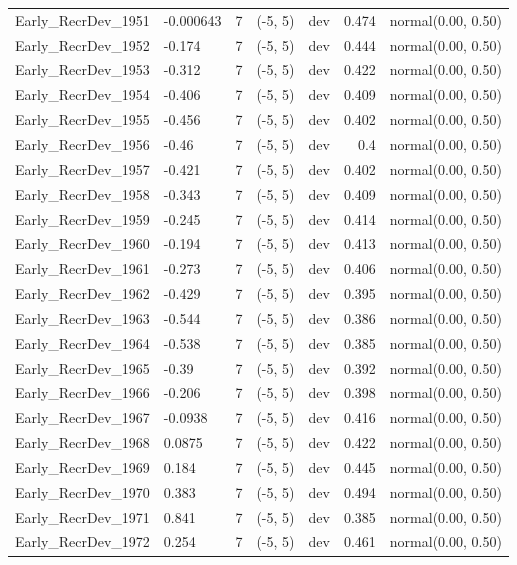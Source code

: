 \documentclass[
]{scrartcl}
\begin{document}
\begin{landscape}
\begin{longtable}{llrllrl}
Early\_RecrDev\_1951 & -0.000643 & 7 & (-5, 5) & dev & 0.474 & normal(0.00, 0.50) \\ 
Early\_RecrDev\_1952 & -0.174 & 7 & (-5, 5) & dev & 0.444 & normal(0.00, 0.50) \\ 
Early\_RecrDev\_1953 & -0.312 & 7 & (-5, 5) & dev & 0.422 & normal(0.00, 0.50) \\ 
Early\_RecrDev\_1954 & -0.406 & 7 & (-5, 5) & dev & 0.409 & normal(0.00, 0.50) \\ 
Early\_RecrDev\_1955 & -0.456 & 7 & (-5, 5) & dev & 0.402 & normal(0.00, 0.50) \\ 
Early\_RecrDev\_1956 & -0.46 & 7 & (-5, 5) & dev & 0.4 & normal(0.00, 0.50) \\ 
Early\_RecrDev\_1957 & -0.421 & 7 & (-5, 5) & dev & 0.402 & normal(0.00, 0.50) \\ 
Early\_RecrDev\_1958 & -0.343 & 7 & (-5, 5) & dev & 0.409 & normal(0.00, 0.50) \\ 
Early\_RecrDev\_1959 & -0.245 & 7 & (-5, 5) & dev & 0.414 & normal(0.00, 0.50) \\ 
Early\_RecrDev\_1960 & -0.194 & 7 & (-5, 5) & dev & 0.413 & normal(0.00, 0.50) \\ 
Early\_RecrDev\_1961 & -0.273 & 7 & (-5, 5) & dev & 0.406 & normal(0.00, 0.50) \\ 
Early\_RecrDev\_1962 & -0.429 & 7 & (-5, 5) & dev & 0.395 & normal(0.00, 0.50) \\ 
Early\_RecrDev\_1963 & -0.544 & 7 & (-5, 5) & dev & 0.386 & normal(0.00, 0.50) \\ 
Early\_RecrDev\_1964 & -0.538 & 7 & (-5, 5) & dev & 0.385 & normal(0.00, 0.50) \\ 
Early\_RecrDev\_1965 & -0.39 & 7 & (-5, 5) & dev & 0.392 & normal(0.00, 0.50) \\ 
Early\_RecrDev\_1966 & -0.206 & 7 & (-5, 5) & dev & 0.398 & normal(0.00, 0.50) \\ 
Early\_RecrDev\_1967 & -0.0938 & 7 & (-5, 5) & dev & 0.416 & normal(0.00, 0.50) \\ 
Early\_RecrDev\_1968 & 0.0875 & 7 & (-5, 5) & dev & 0.422 & normal(0.00, 0.50) \\ 
Early\_RecrDev\_1969 & 0.184 & 7 & (-5, 5) & dev & 0.445 & normal(0.00, 0.50) \\ 
Early\_RecrDev\_1970 & 0.383 & 7 & (-5, 5) & dev & 0.494 & normal(0.00, 0.50) \\ 
Early\_RecrDev\_1971 & 0.841 & 7 & (-5, 5) & dev & 0.385 & normal(0.00, 0.50) \\ 
Early\_RecrDev\_1972 & 0.254 & 7 & (-5, 5) & dev & 0.461 & normal(0.00, 0.50) \\ 

\end{longtable}
\end{landscape}
\end{document}
